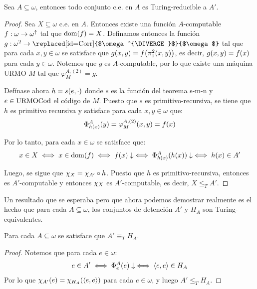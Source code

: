 \begin{agregado}
\begin{agregado}
\begin{theorem}
	\label{theo: completitud_salto}
	Sea $A\subseteq\omega$, entonces todo conjunto c.e. en $A$ es Turing-reducible a $A'$.
\end{theorem}

\begin{proof}
	Sea $X\subseteq\omega$ c.e. en $A$. Entonces existe una función $A$-computable $f:\omega\to\omega^{\uparrow}$ tal que $\DOMINIO{f} = X$. Definamos entonces la función $g:\omega^{2}\to\mbox{\replaced[id=Corr]{$\omega^{\DIVERGE}$}{$\omega$}}$ tal que para cada $x, y\in\omega$ se satisface que $g\pa*{x, y} = f\pa*{\PROYECCION{2}{1}\pa*{x, y}}$, es decir, $g\pa*{x, y} = f\pa*{x}$ para cada $y\in\omega$. Notemos que $g$ es $A$-computable, por lo que existe una máquina URMO $M$ tal que $\varphi_{M}^{A, (2)} = g$.

	Defínase ahora $h = s\pa*{e,\cdot}$ donde $s$ es la función del teorema s-m-n y $e\in\mathrm{URMOCod}$ el código de $M$. Puesto que $s$ es primitivo-recursiva, se tiene que $h$ es primitivo recursiva y satisface para cada $x, y\in\omega$ que:
	\[
		\Phi_{h\pa*{x}}^{A}\pa*{y} =\varphi_{M}^{A, (2)}\pa*{x, y} = f\pa*{x}
	\]

	Por lo tanto, para cada $x\in\omega$ se satisface que:
	\[
		x\in X\iff x\in\DOMINIO{f}\iff f\pa*{x}\ACABA\iff\Phi_{h\pa*{x}}^{A}\pa*{h\pa*{x}}\ACABA\iff h\pa*{x}\in A'
	\]

	Luego, se sigue que $\chi_{X} =\chi_{A'}\circ h$. Puesto que $h$ es primitivo-recursiva, entonces es $A'$-computable y entonces $\chi_{X}$ es $A'$-computable, es decir, $X\leq_{T} A'$.
\end{proof}

Un resultado que se esperaba pero que ahora podemos demostrar realmente es el hecho que para cada $A\subseteq\omega$, los conjuntos de detención $A'$ y $H_{A}$ son Turing-equivalentes.

\begin{theorem}
	\label{theo: salto_equivalente_h}
	Para cada $A\subseteq\omega$ se satisface que $A'\equiv_{T} H_{A}$.
\end{theorem}

\begin{proof}
	Notemos que para cada $e\in\omega$:
	\[
		e\in A'\iff\Phi_{e}^{A}\pa*{e}\ACABA\iff\inner*{e, e}\in H_{A}
	\]
	Por lo que $\CARACTERISTICA{A'}\pa*{e} =\CARACTERISTICA{H_{A}}\pa*{\inner*{e, e}}$ para cada $e\in\omega$, y luego $A'\leq_{T} H_{A}$.


\end{proof}
\end{agregado}
\end{agregado}
